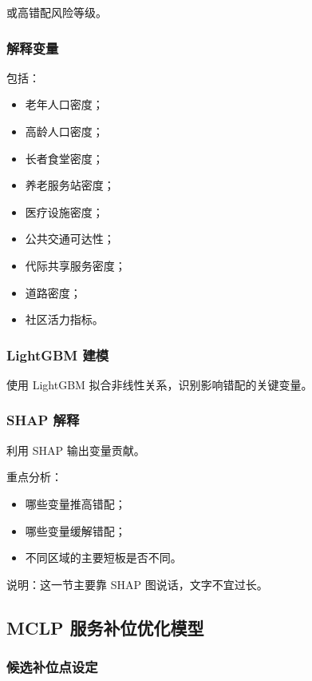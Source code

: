 \documentclass[UTF8,zihao=-4,a4paper,fontset=none]{ctexart}
\begin{document}
或高错配风险等级。

\subsubsection{解释变量}

包括：

\begin{itemize}
\item 老年人口密度；
\item 高龄人口密度；
\item 长者食堂密度；
\item 养老服务站密度；
\item 医疗设施密度；
\item 公共交通可达性；
\item 代际共享服务密度；
\item 道路密度；
\item 社区活力指标。
\end{itemize}

\subsubsection{LightGBM 建模}

使用 LightGBM 拟合非线性关系，识别影响错配的关键变量。

\subsubsection{SHAP 解释}

利用 SHAP 输出变量贡献。

重点分析：

\begin{itemize}
\item 哪些变量推高错配；
\item 哪些变量缓解错配；
\item 不同区域的主要短板是否不同。
\end{itemize}

说明：这一节主要靠 SHAP 图说话，文字不宜过长。

\subsection{MCLP 服务补位优化模型}

\subsubsection{候选补位点设定}
\end{document}
